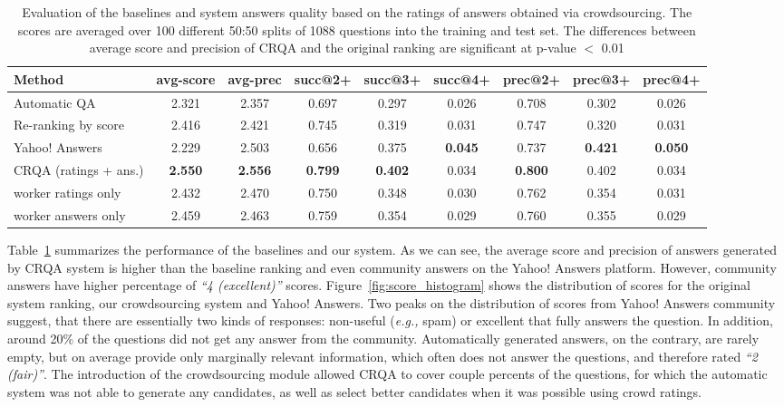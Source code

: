 \documentclass[letterpaper]{article}
\makeatletter
\newcommand{\eg}{\textit{e.g.,}\@\xspace}
\makeatother
\begin{document}
\begin{table}[ht]
\centering
\begin{tabular}{| p{3.5cm} | c | c | c | c | c | c | c | c |}
\hline
Method & avg-score & avg-prec & succ@2+ & succ@3+ & succ@4+ & prec@2+ & prec@3+ & prec@4+ \\
\hline
Automatic QA & 2.321 & 2.357 & 0.697 & 0.297 & 0.026 & 0.708 & 0.302 & 0.026 \\
Re-ranking by score & 2.416 & 2.421 & 0.745 & 0.319 & 0.031 & 0.747 & 0.320 & 0.031 \\
Yahoo! Answers & 2.229 & 2.503 & 0.656 & 0.375 & \textbf{0.045} & 0.737 & \textbf{0.421} & \textbf{0.050} \\
CRQA (ratings + ans.) & \textbf{2.550} & \textbf{2.556} & \textbf{0.799} & \textbf{0.402} & 0.034 & \textbf{0.800} & 0.402 & 0.034 \\
\hspace{5mm}worker ratings only & 2.432 & 2.470 & 0.750 & 0.348 & 0.030 & 0.762 & 0.354 & 0.031 \\
\hspace{5mm}worker answers only & 2.459 & 2.463 & 0.759 & 0.354 & 0.029 & 0.760 & 0.355 & 0.029 \\
\hline
\end{tabular}
\caption{Evaluation of the baselines and system answers quality based on the ratings of answers obtained via crowdsourcing. The scores are averaged over 100 different 50:50 splits of 1088 questions into the training and test set. The differences between average score and precision of CRQA and the original ranking are significant at p-value $<$ 0.01}
\label{table:performance}
\end{table}

Table~\ref{table:performance} summarizes the performance of the baselines and our system.
As we can see, the average score and precision of answers generated by CRQA system is higher than the baseline ranking and even community answers on the Yahoo! Answers platform.
However, community answers have higher percentage of \textit{``4 (excellent)''} scores.
Figure~\ref{fig:score_histogram} shows the distribution of scores for the original system ranking, our crowdsourcing system and Yahoo! Answers.
Two peaks on the distribution of scores from Yahoo! Answers community suggest, that there are essentially two kinds of responses: non-useful (\eg spam) or excellent that fully answers the question.
In addition, around 20\% of the questions did not get any answer from the community.
Automatically generated answers, on the contrary, are rarely empty, but on average provide only marginally relevant information, which often does not answer the questions, and therefore rated \textit{``2 (fair)''}.
The introduction of the crowdsourcing module allowed CRQA to cover couple percents of the questions, for which the automatic system was not able to generate any candidates, as well as select better candidates when it was possible using crowd ratings.
\end{document}

